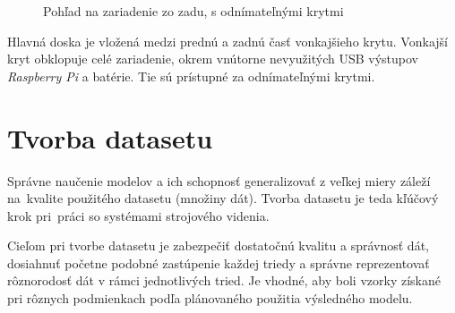         \begin{figure}[H]
            \centering
            \caption{Pohľad na zariadenie zo zadu, s odnímateľnými krytmi}
        \end{figure}

        Hlavná doska je vložená medzi prednú a zadnú časť vonkajšieho krytu. Vonkajší kryt obklopuje celé zariadenie, okrem vnútorne nevyužitých USB výstupov \emph{Raspberry Pi} a batérie. Tie sú prístupné za odnímateľnými krytmi.  

\chapter{Tvorba datasetu}

    Správne naučenie modelov a ich schopnosť generalizovať z veľkej miery záleží na~kvalite použitého datasetu (množiny dát). Tvorba datasetu je teda kľúčový krok pri~práci so systémami strojového videnia.

    Cieľom pri tvorbe datasetu je zabezpečiť dostatočnú kvalitu a správnosť dát, dosiahnuť početne podobné zastúpenie každej triedy a správne reprezentovať rôznorodosť dát v rámci jednotlivých tried. Je vhodné, aby boli vzorky získané pri rôznych podmienkach podľa plánovaného použitia výsledného modelu.


